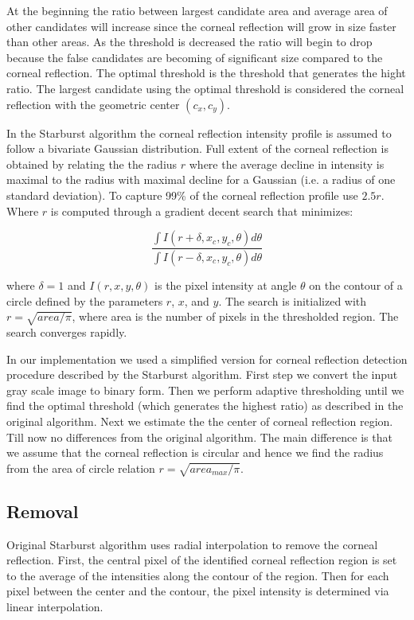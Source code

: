 \documentclass[12pt,fleqn]{book} %
\begin{document}
At the beginning the ratio between  largest candidate area and average area of other candidates will increase since the corneal reflection will grow in size faster than other areas. As the threshold is decreased the ratio will begin to drop because the false candidates are becoming of significant size compared to the corneal reflection. The optimal threshold is the threshold that generates the hight ratio. The largest candidate using the optimal threshold is considered the corneal reflection with the geometric center $(c_{x}, c_{y})$. \bigskip

In the Starburst algorithm the corneal reflection intensity profile is assumed to follow a bivariate Gaussian distribution. Full extent of the corneal reflection is obtained by relating the the radius $r$ where the average decline in intensity is maximal to the radius with maximal decline for a Gaussian (i.e. a radius of one standard deviation). To capture 99\% of the corneal reflection profile use $2.5r$. Where $r$ is computed through a gradient decent search that minimizes:


\begin{dBox}
	\begin{equation}
		\frac{ \int I ( r + \delta, x_{c}, y_{c}, \theta ) d\theta }{ \int I ( r - \delta, x_{c}, y_{c}, \theta ) d\theta}
	\end{equation}
\end{dBox}

where $\delta = 1$ and $I(r, x, y, \theta)$ is the pixel intensity at angle $\theta$ on the contour of a circle defined by the parameters $r$, $x$, and $y$. The search is initialized with $r = \sqrt{area/\pi}$, where area is the number of pixels in the thresholded region. The search converges rapidly.\bigskip

In our implementation we used a simplified version for corneal reflection detection procedure described by the Starburst algorithm. First step we convert the input gray scale image to binary form. Then we perform adaptive thresholding until we find the optimal threshold (which generates the highest ratio) as described in the original algorithm. Next we estimate the the center of corneal reflection region. Till now no differences from the original algorithm. The main difference is that we assume that the corneal reflection is circular and hence we find the radius from the area of circle relation $r = \sqrt{ area_{max} / \pi }$.

\subsection{Removal}
Original Starburst algorithm uses radial interpolation to remove the corneal reflection. First, the central pixel of the identified corneal reflection region is set to the average of the intensities along the contour of the region. Then for each pixel between the center and the contour, the pixel intensity is determined via linear interpolation. \bigskip
\end{document}
